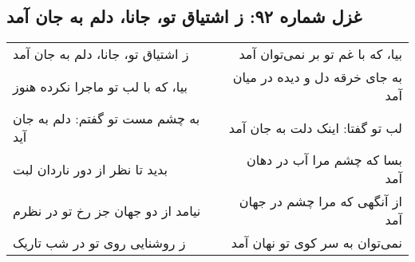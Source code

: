 \begin{center}
\section*{غزل شماره ۹۲: ز اشتیاق تو، جانا، دلم به جان آمد}
\label{sec:092}
\begin{longtable}{l p{0.5cm} r}
ز اشتیاق تو، جانا، دلم به جان آمد
&&
بیا، که با غم تو بر نمی‌توان آمد
\\
بیا، که با لب تو ماجرا نکرده هنوز
&&
به جای خرقه دل و دیده در میان آمد
\\
به چشم مست تو گفتم: دلم به جان آید
&&
لب تو گفتا: اینک دلت به جان آمد
\\
بدید تا نظر از دور ناردان لبت
&&
بسا که چشم مرا آب در دهان آمد
\\
نیامد از دو جهان جز رخ تو در نظرم
&&
از آنگهی که مرا چشم در جهان آمد
\\
ز روشنایی روی تو در شب تاریک
&&
نمی‌توان به سر کوی تو نهان آمد
\\
\end{longtable}
\end{center}
